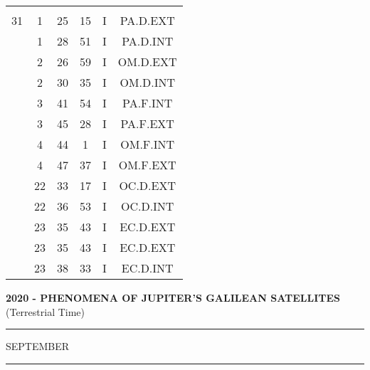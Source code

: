 \documentclass[12pt, a4paper]{article}
\begin{document}
\begin{multicols}{3}
{\begin{tabular}{c c c c c c}
	 	 	 	 & & & & & \\%
	 	 	 	31 & 1 & 25 & 15 & I & PA.D.EXT\\%
	 	 	 	 & 1 & 28 & 51 & I & PA.D.INT\\%
	 	 	 	 & 2 & 26 & 59 & I & OM.D.EXT\\%
	 	 	 	 & 2 & 30 & 35 & I & OM.D.INT\\%
	 	 	 	 & 3 & 41 & 54 & I & PA.F.INT\\%
	 	 	 	 & 3 & 45 & 28 & I & PA.F.EXT\\%
	 	 	 	 & 4 & 44 & 1 & I & OM.F.INT\\%
	 	 	 	 & 4 & 47 & 37 & I & OM.F.EXT\\%
	 	 	 	 & 22 & 33 & 17 & I & OC.D.EXT\\%
	 	 	 	 & 22 & 36 & 53 & I & OC.D.INT\\%
	 	 	 	 & 23 & 35 & 43 & I & EC.D.EXT\\%
	 	 	 	 & 23 & 35 & 43 & I & EC.D.EXT\\%
	 	 	 	 & 23 & 38 & 33 & I & EC.D.INT\\%
	 	 \end{tabular}
 	}
\end{multicols}
\textbf{2020 - PHENOMENA OF JUPITER'S GALILEAN SATELLITES}\\(Terrestrial Time) 
\vspace{0.1cm} \hrule \vspace{0.1cm}
SEPTEMBER\vspace{0.1cm}
\hrule
\vspace{-0.2cm}
\end{document}
